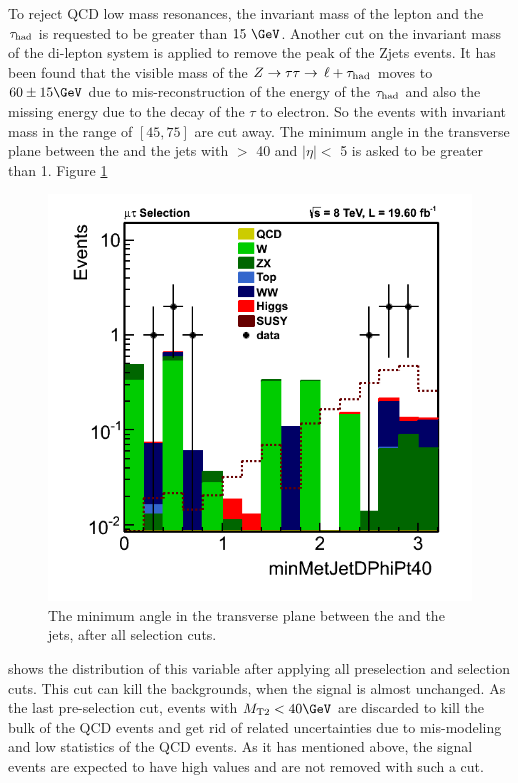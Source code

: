 To reject QCD low mass resonances, the invariant mass of the lepton and the $\tau_{\rm had}$ is requested to be greater than $15\ \GeV$. Another cut on the invariant mass of the di-lepton system is applied to remove the peak of the Zjets events. It has been found that the visible mass of the $Z\to\tau\tau\to\,\ell +\tau_{\rm had}$ moves to $60 \pm 15 \GeV$ due to mis-reconstruction of the energy of the $\tau_{\rm had}$ and also the missing energy due to the decay of the $\tau$ to electron. So the events with invariant mass in the range of $[45,75]$ are cut away. The minimum angle in the transverse plane between the \MET and the jets with \PT $>$ 40 \GeVc and $|\eta| <$ 5 is asked to be greater than 1. Figure \ref{fig:minDphi}
\begin{figure}[!Hhtb]
\centering
\includegraphics[angle=0,scale=0.35]{SelectionMuTau/minMetJetDPhi.png}
\caption{The minimum angle in the transverse plane between the \MET and the jets, after all \muTau selection cuts.}
\label{fig:minDphi}
\end{figure}
shows the distribution of this variable after applying all preselection and selection cuts. This cut can kill the backgrounds, 
when the signal is almost unchanged.
As the last pre-selection cut, events with $\mttwo<40 \GeV$ are discarded to kill the bulk of the QCD events and get rid of related uncertainties due to mis-modeling and low statistics 
of the QCD events. As it has mentioned above, the signal events are expected to have high \mttwo values and are not removed with such a cut.

